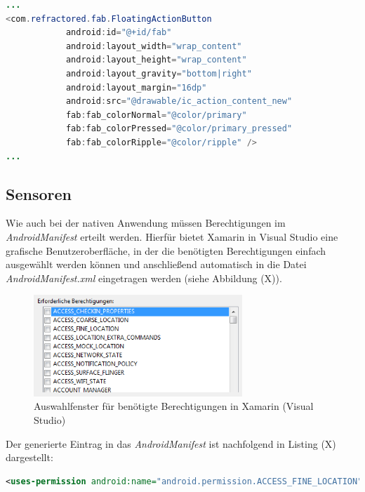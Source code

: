 \begin{lstlisting}[caption=Deklaration des \textit{FloatingActionButton} in der Datei \textit{app\_bar.axml}, label=lst:FABXamarin, language=Java]
...
<com.refractored.fab.FloatingActionButton
            android:id="@+id/fab"
            android:layout_width="wrap_content"
            android:layout_height="wrap_content"
            android:layout_gravity="bottom|right"
            android:layout_margin="16dp"
            android:src="@drawable/ic_action_content_new"
            fab:fab_colorNormal="@color/primary"
            fab:fab_colorPressed="@color/primary_pressed"
            fab:fab_colorRipple="@color/ripple" />
...
\end{lstlisting}

\subsection{Sensoren}

Wie auch bei der nativen Anwendung müssen Berechtigungen im \textit{AndroidManifest} erteilt werden. Hierfür bietet Xamarin in Visual Studio eine grafische Benutzeroberfläche, in der die benötigten Berechtigungen einfach ausgewählt werden können und anschließend automatisch in die Datei \textit{AndroidManifest.xml} eingetragen werden (siehe Abbildung (X)). 

\begin{figure}[h]
	\centering
	\includegraphics[width=0.7\textwidth]{Bilder/Permissions_Xamarin.PNG}
	\caption{Auswahlfenster für benötigte Berechtigungen in Xamarin (Visual Studio)}
	\label{fig:Suchanfragen1}
\end{figure}

Der generierte Eintrag in das \textit{AndroidManifest} ist nachfolgend in Listing (X) dargestellt:

\begin{lstlisting}[caption=Erlaubnis für die Nutzung eines Dienstes im \textit{AndroidManifest} (Xamarin), label=lst:usesPermissionXamarin, language=XML]
<uses-permission android:name="android.permission.ACCESS_FINE_LOCATION" />
\end{lstlisting}

